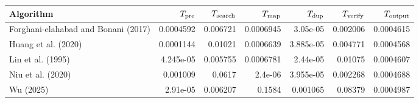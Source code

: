 \begin{tabular}{lrrrrrr}
\toprule
Algorithm & $T_{\rm pre}$ & $T_{\rm search}$ & $T_{\rm map}$ & $T_{\rm dup}$ & $T_{\rm verify}$ & $T_{\rm output}$ \\
\midrule
Forghani-elahabad and Bonani (2017) & 0.0004592 & 0.006721 & 0.0006945 & 3.05e-05 & 0.002006 & 0.0004615 \\
Huang et al. (2020) & 0.0001144 & 0.01021 & 0.0006639 & 3.885e-05 & 0.004771 & 0.0004568 \\
Lin et al. (1995) & 4.245e-05 & 0.005755 & 0.0006781 & 2.44e-05 & 0.01075 & 0.0004607 \\
Niu et al. (2020) & 0.001009 & 0.0617 & 2.4e-06 & 3.955e-05 & 0.002268 & 0.0004688 \\
Wu (2025) & 2.91e-05 & 0.006207 & 0.1584 & 0.001065 & 0.08379 & 0.0004987 \\
\bottomrule
\end{tabular}
